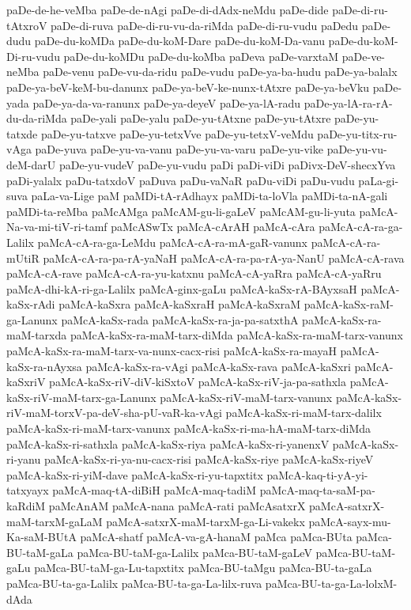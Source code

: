 {paDe-de-he-veMba
paDe-de-nAgi
paDe-di-dAdx-neMdu
paDe-dide
paDe-di-ru-tAtxroV
paDe-di-ruva
paDe-di-ru-vu-da-riMda
paDe-di-ru-vudu
paDedu
paDe-dudu
paDe-du-koMDa
paDe-du-koM-Dare
paDe-du-koM-Da-vanu
paDe-du-koM-Di-ru-vudu
paDe-du-koMDu
paDe-du-koMba
paDeva
paDe-varxtaM
paDe-ve-neMba
paDe-venu
paDe-vu-da-ridu
paDe-vudu
paDe-ya-ba-hudu
paDe-ya-balalx
paDe-ya-beV-keM-bu-danunx
paDe-ya-beV-ke-nunx-tAtxre
paDe-ya-beVku
paDe-yada
paDe-ya-da-va-ranunx
paDe-ya-deyeV
paDe-ya-lA-radu
paDe-ya-lA-ra-rA-du-da-riMda
paDe-yali
paDe-yalu
paDe-yu-tAtxne
paDe-yu-tAtxre
paDe-yu-tatxde
paDe-yu-tatxve
paDe-yu-tetxVve
paDe-yu-tetxV-veMdu
paDe-yu-titx-ru-vAga
paDe-yuva
paDe-yu-va-vanu
paDe-yu-va-varu
paDe-yu-vike
paDe-yu-vu-deM-darU
paDe-yu-vudeV
paDe-yu-vudu
paDi
paDi-viDi
paDivx-DeV-shecxYva
paDi-yalalx
paDu-tatxdoV
paDuva
paDu-vaNaR
paDu-viDi
paDu-vudu
paLa-gi-suva
paLa-va-Lige
paM
paMDi-tA-rAdhayx
paMDi-ta-loVla
paMDi-ta-nA-gali
paMDi-ta-reMba
paMcAMga
paMcAM-gu-li-gaLeV
paMcAM-gu-li-yuta
paMcA-Na-va-mi-tiV-ri-tamf
paMcASwTx
paMcA-cArAH
paMcA-cAra
paMcA-cA-ra-ga-Lalilx
paMcA-cA-ra-ga-LeMdu
paMcA-cA-ra-mA-gaR-vanunx
paMcA-cA-ra-mUtiR
paMcA-cA-ra-pa-rA-yaNaH
paMcA-cA-ra-pa-rA-ya-NanU
paMcA-cA-rava
paMcA-cA-rave
paMcA-cA-ra-yu-katxnu
paMcA-cA-yaRra
paMcA-cA-yaRru
paMcA-dhi-kA-ri-ga-Lalilx
paMcA-ginx-gaLu
paMcA-kaSx-rA-BAyxsaH
paMcA-kaSx-rAdi
paMcA-kaSxra
paMcA-kaSxraH
paMcA-kaSxraM
paMcA-kaSx-raM-ga-Lanunx
paMcA-kaSx-rada
paMcA-kaSx-ra-ja-pa-satxthA
paMcA-kaSx-ra-maM-tarxda
paMcA-kaSx-ra-maM-tarx-diMda
paMcA-kaSx-ra-maM-tarx-vanunx
paMcA-kaSx-ra-maM-tarx-va-nunx-cacx-risi
paMcA-kaSx-ra-mayaH
paMcA-kaSx-ra-nAyxsa
paMcA-kaSx-ra-vAgi
paMcA-kaSx-rava
paMcA-kaSxri
paMcA-kaSxriV
paMcA-kaSx-riV-diV-kiSxtoV
paMcA-kaSx-riV-ja-pa-sathxla
paMcA-kaSx-riV-maM-tarx-ga-Lanunx
paMcA-kaSx-riV-maM-tarx-vanunx
paMcA-kaSx-riV-maM-torxV-pa-deV-sha-pU-vaR-ka-vAgi
paMcA-kaSx-ri-maM-tarx-dalilx
paMcA-kaSx-ri-maM-tarx-vanunx
paMcA-kaSx-ri-ma-hA-maM-tarx-diMda
paMcA-kaSx-ri-sathxla
paMcA-kaSx-riya
paMcA-kaSx-ri-yanenxV
paMcA-kaSx-ri-yanu
paMcA-kaSx-ri-ya-nu-cacx-risi
paMcA-kaSx-riye
paMcA-kaSx-riyeV
paMcA-kaSx-ri-yiM-dave
paMcA-kaSx-ri-yu-tapxtitx
paMcA-kaq-ti-yA-yi-tatxyayx
paMcA-maq-tA-diBiH
paMcA-maq-tadiM
paMcA-maq-ta-saM-pa-kaRdiM
paMcAnAM
paMcA-nana
paMcA-rati
paMcAsatxrX
paMcA-satxrX-maM-tarxM-gaLaM
paMcA-satxrX-maM-tarxM-ga-Li-vakekx
paMcA-sayx-mu-Ka-saM-BUtA
paMcA-shatf
paMcA-va-gA-hanaM
paMca
paMca-BUta
paMca-BU-taM-gaLa
paMca-BU-taM-ga-Lalilx
paMca-BU-taM-gaLeV
paMca-BU-taM-gaLu
paMca-BU-taM-ga-Lu-tapxtitx
paMca-BU-taMgu
paMca-BU-ta-gaLa
paMca-BU-ta-ga-Lalilx
paMca-BU-ta-ga-La-lilx-ruva
paMca-BU-ta-ga-La-lolxM-dAda
}
